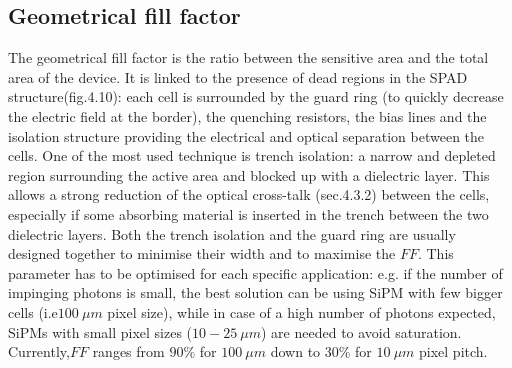 \subsection*{Geometrical fill factor}
The geometrical fill factor is the ratio between the sensitive area and the total area of the device. It is linked to the presence of dead regions in the SPAD structure(fig.4.10): each cell is surrounded by the guard ring (to quickly decrease the electric field at the border),  the quenching resistors,  the bias lines and the isolation structure providing the electrical and optical separation between the cells. One of the most used technique is trench isolation: a narrow and depleted region surrounding the active area and blocked up with a dielectric layer. This allows a strong reduction of the optical cross-talk (sec.4.3.2) between the cells, especially if some absorbing material is inserted in the trench between the two dielectric layers. Both the trench isolation and the guard ring are usually designed together to minimise their width and to maximise the $FF$.
This parameter has to be optimised for each specific application: e.g. if the number of impinging photons is small, the best solution can be using SiPM with few bigger cells (i.e$100\ \mu m$ pixel size), while in case of a high number of photons expected, SiPMs with small pixel sizes ($10-25\ \mu m$) are needed to avoid saturation. Currently,$FF$ ranges from $90\%$ for $100\ \mu m$ down to $30\%$ for $10\ \mu m$ pixel pitch.\\

